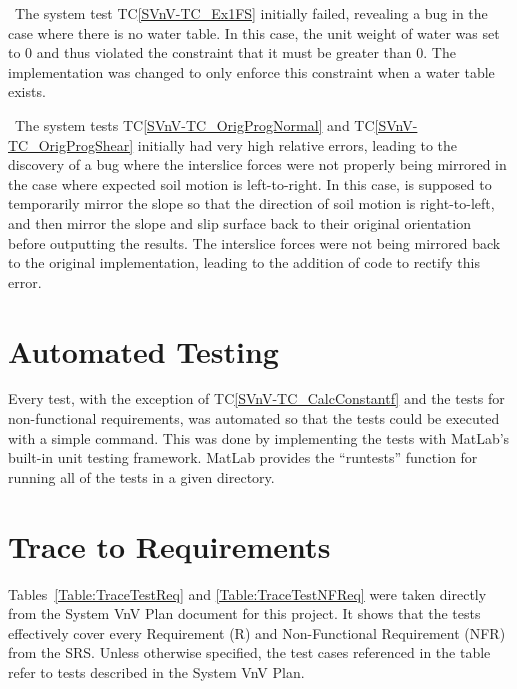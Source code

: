 \documentclass[12pt, titlepage]{article}
\newcommand{\tcref}[1]{TC\ref{#1}}
\begin{document}
~\newline \noindent The system test \tcref{SVnV-TC_Ex1FS} initially failed, 
revealing a bug in the case where there is no water table. In this case, the 
unit weight of water was set to 0 and thus violated the constraint that it must 
be greater than 0. The implementation was changed to only enforce this 
constraint when a water table exists.

~\newline \noindent The system tests \tcref{SVnV-TC_OrigProgNormal} 
and \tcref{SVnV-TC_OrigProgShear} initially had very high relative errors, 
leading to the discovery of a bug where the interslice forces were not properly 
being mirrored in the case where expected soil motion is left-to-right. In this 
case, \progname{} is supposed to temporarily mirror the slope so that the 
direction of soil motion is right-to-left, and then mirror the slope and slip 
surface back to their original orientation before outputting the results. The 
interslice forces were not being mirrored back to the original implementation, 
leading to the addition of code to rectify this error.

\section{Automated Testing} \label{sec_AutoTests}

Every test, with the exception of \tcref{SVnV-TC_CalcConstantf} and the tests 
for non-functional requirements, was automated so that the tests could be 
executed with a simple command. This was done by implementing the tests with 
MatLab's built-in unit testing framework. MatLab provides the ``runtests'' 
function for running all of the tests in a given directory.
		
\section{Trace to Requirements} \label{sec_TraceReq}

Tables~\ref{Table:TraceTestReq} and \ref{Table:TraceTestNFReq} were taken 
directly from the System VnV Plan document for this project. It shows that the 
tests effectively cover every Requirement (R) and Non-Functional Requirement 
(NFR) from the SRS. Unless otherwise specified, the test cases referenced in 
the table refer to tests described in the System VnV Plan.
\end{document}
